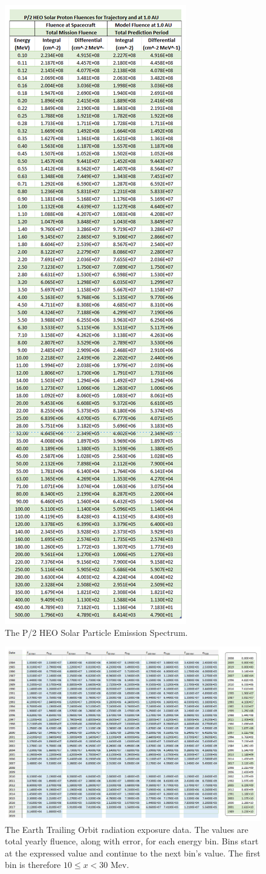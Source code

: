 \documentclass[11pt]{article}
\begin{document}
\begin{figure}[H]
    \centering
        \includegraphics[width=0.40\linewidth]{TESS_SP.png}
        \caption{The P/2 HEO Solar Particle Emission Spectrum.}
        \label{fig:TESSSP}
\end{figure}

\begin{figure}[H]
    \centering
        \includegraphics[width=1\linewidth]{ETO_Events.png}
        \caption{The Earth Trailing Orbit radiation exposure data. The values are total yearly fluence, along with error, for each energy bin. Bins start at the expressed value and continue to the next bin's value. The first bin is therefore $ 10 \leq x < 30 $  Mev. }
        \label{fig:ETORad}
\end{figure}
\end{document}
